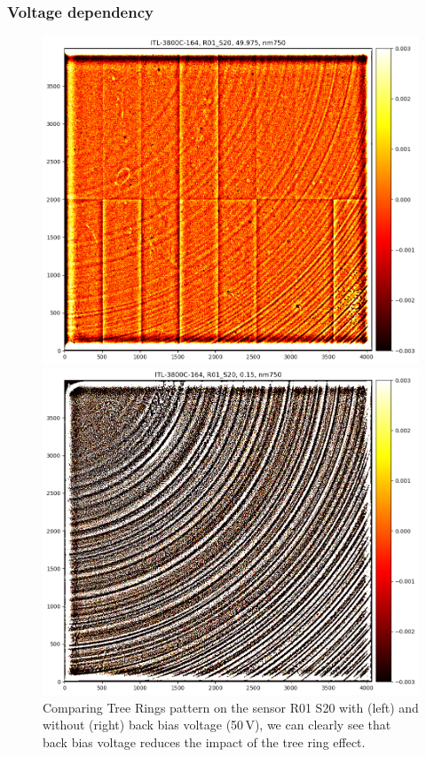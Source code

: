 \subsubsection{Voltage dependency}
\begin{figure}[ht]
\centering
\begin{minipage}[b]{0.45\textwidth}
\centering
\includegraphics[width=\textwidth]{figures/R01_S20_wBBV.png}
\end{minipage}
\begin{minipage}[b]{0.45\textwidth}
\centering
\includegraphics[width=\textwidth]{figures/R01_S20_woBBV.png}
\end{minipage}
\caption{Comparing Tree Rings pattern on the sensor R01 S20 with (left) and without (right) back bias voltage (50\,V), we can clearly see that back bias voltage reduces the impact of the tree ring effect.}
\end{figure}

